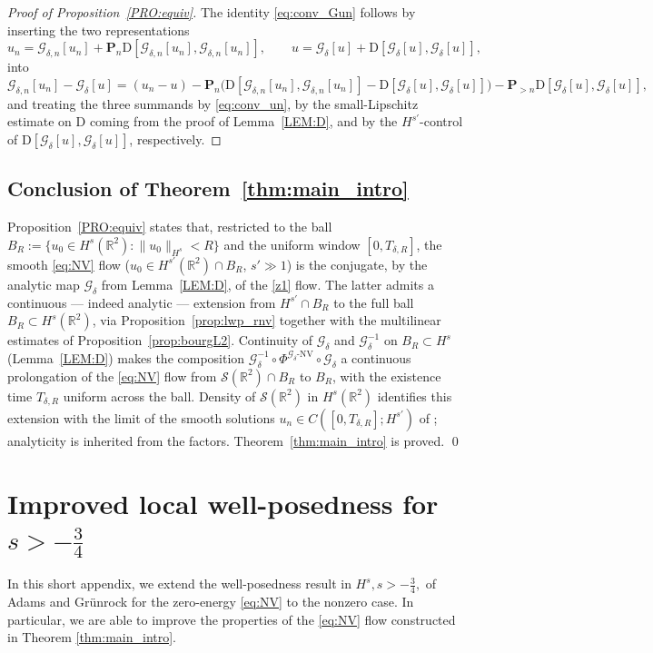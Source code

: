 \documentclass[a4paper,
11pt,  reqno]{amsart}
\newcommand{\5}{\textup{V}}
\newcommand{\dl}{\delta}
\theoremstyle{remark}
\newcommand{\R}{\mathbb{R}}
\newcommand{\Gc}{\mathcal{G}}
\numberwithin{equation}{section}
\numberwithin{theorem}{section}
\newcommand{\D}{\mathrm{D}}
\begin{document}
\begin{proof}[Proof of Proposition~\textup{\ref{PRO:equiv}}]
The identity \eqref{eq:conv_Gun} follows by inserting the two
representations
\[
u_n=\Gc_{\dl,n}[u_n]+\mathbf{P}_n\D[\Gc_{\dl,n}[u_n],\Gc_{\dl,n}[u_n]],
\qquad
u=\Gc_\dl[u]+\D[\Gc_\dl[u],\Gc_\dl[u]],
\]
into
\[
\Gc_{\dl,n}[u_n]-\Gc_\dl[u]
= (u_n-u)
- \mathbf{P}_n\big(\D[\Gc_{\dl,n}[u_n],\Gc_{\dl,n}[u_n]]
- \D[\Gc_\dl[u],\Gc_\dl[u]]\big)
- \mathbf{P}_{>n}\D[\Gc_\dl[u],\Gc_\dl[u]],
\]
and treating the three summands by \eqref{eq:conv_un}, by the
small-Lipschitz estimate on $\D$ coming from the proof of
Lemma~\ref{LEM:D}, and by the $H^{s'}$-control of
$\D[\Gc_\dl[u],\Gc_\dl[u]]$, respectively.
\end{proof}

\subsection{Conclusion of Theorem~\ref{thm:main_intro}}

Proposition~\ref{PRO:equiv} states that, restricted to the ball
$B_R:=\{u_0\in H^s(\R^2):\|u_0\|_{H^s}<R\}$ and the uniform window
$[0,T_{\dl,R}]$, the smooth \eqref{eq:NV} flow
($u_0\in H^{s'}(\R^2)\cap B_R$, $s'\gg 1$) is the conjugate, by the
analytic map $\Gc_\dl$ from Lemma~\ref{LEM:D}, of the \eqref{z1}
flow. The latter admits a continuous --- indeed analytic ---
extension from $H^{s'}\cap B_R$ to the full ball $B_R\subset H^s(\R^2)$,
via Proposition~\ref{prop:lwp_rnv} together with the multilinear
estimates of Proposition~\ref{prop:bourgL2}. Continuity of $\Gc_\dl$
and $\Gc_\dl^{-1}$ on $B_R\subset H^s$ (Lemma~\ref{LEM:D}) makes the
composition
$\Gc_\dl^{-1}\circ\Phi^{\Gc_\dl\text{-NV}}\circ\Gc_\dl$
a continuous prolongation of the \eqref{eq:NV} flow from
$\mathcal{S}(\R^2)\cap B_R$ to $B_R$, with the existence time
$T_{\dl,R}$ uniform across the ball. Density of
$\mathcal{S}(\R^2)$ in $H^s(\R^2)$ identifies this extension with
the limit of the smooth solutions
$u_n\in C([0,T_{\dl,R}];H^{s'})$ of
\cite{angelopolous,kazeykinamunoz1,kazeykinamunoz2}; analyticity is
inherited from the factors. Theorem~\ref{thm:main_intro} is
proved.
\qed


\appendix

\section{Improved local well-posedness for \texorpdfstring{$s>-\frac34$}{s>-3/4}}\label{sec:s-34}

In this short appendix, we extend the well-posedness result in $H^s, s>-\frac34,$ of Adams and Grünrock for the zero-energy \eqref{eq:NV} to the nonzero case. In particular, we are able to improve the properties of the \eqref{eq:NV} flow constructed in Theorem \ref{thm:main_intro}. 
\end{document}
